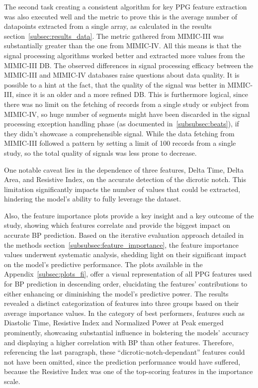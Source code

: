 The second task creating a consistent algorithm for key PPG feature extraction was also executed well and the metric to prove this is the average number of datapoints extracted from a single array,
as calculated in the results section~\ref{subsec:results_data}.
The metric gathered from MIMIC-III was substantially greater than the one from MIMIC-IV\@.
All this means is that the signal processing algorithms worked better and extracted more values from the MIMIC-III DB\@.
The observed differences in signal processing efficacy between the MIMIC-III and MIMIC-IV databases raise questions about data quality.
It is possible to a hint at the fact, that the quality of the signal was better in MIMIC-III, since it is an older and a more refined DB\@.
This is furthermore logical, since there was no limit on the fetching of records from a single study or subject from MIMIC-IV,
so huge number of segments might have been discarded in the signal processing exception handling phase (as documented in~\ref{subsubsec:beats}), if they didn't showcase a comprehensible signal.
While the data fetching from MIMIC-III followed a pattern by setting a limit of 100 records from a single study, so the total quality of signals was less prone to decrease.

One notable caveat lies in the dependence of three features, Delta Time, Delta Area, and Resistive Index, on the accurate detection of the dicrotic notch.
This limitation significantly impacts the number of values that could be extracted, hindering the model's ability to fully leverage the dataset.

Also, the feature importance plots provide a key insight and a key outcome of the study, showing which features correlate and provide the biggest impact on accurate BP prediction.
Based on the iterative evaluation approach detailed in the methods section~\ref{subsubsec:feature_importance}, the feature importance values underwent systematic analysis, shedding light on their significant impact on the model's predictive performance.
The plots available in the Appendix~\ref{subsec:plots_fi}, offer a visual representation of all PPG features used for BP prediction in descending order,
elucidating the features' contributions to either enhancing or diminishing the model's predictive power.
The results revealed a distinct categorization of features into three groups based on their average importance values.
In the category of best performers, features such as Diastolic Time, Resistive Index and Normalized Power at Peak emerged prominently, showcasing substantial influence in bolstering the models' accuracy
and displaying a higher correlation with BP than other features.
Therefore, referencing the last paragraph, these \enquote{dicrotic-notch-dependant} features could not have been omitted, since the prediction performance would have suffered,
because the Resistive Index was one of the top-scoring features in the importance scale.

